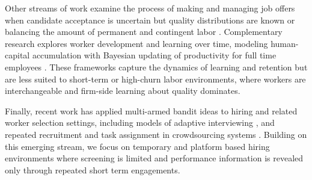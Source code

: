 \documentclass[opre,blindrev]{informs3}
\begin{document}
Other streams of work examine the process of making and managing job offers when candidate acceptance is uncertain but quality distributions are known \citep{purohit2019hiring, epstein2024selection, gans2002managing, du2024sequential} or balancing the amount of permanent and contingent labor \citep{king2016dynamic, dong2020managing, berenguer2024managing, lobel2024frontiers}.
Complementary research explores worker development and learning over time, modeling human-capital accumulation with Bayesian updating of productivity for full time employees \citep{arlotto2014optimal}. These frameworks capture the dynamics of learning and retention but are less suited to short-term or high-churn labor environments, where workers are interchangeable and firm-side learning about quality dominates.

Finally, recent work has applied multi-armed bandit ideas to hiring and related worker selection settings, including models of adaptive interviewing \citep{schumann2019making}, and repeated recruitment and task assignment in crowdsourcing systems \citep{gao2020combinatorial, rangi2018multi}. Building on this emerging stream, we focus on temporary and platform based hiring environments where screening is limited and performance information is revealed only through repeated short term engagements. 



\vspace{-.1in}
\end{document}
